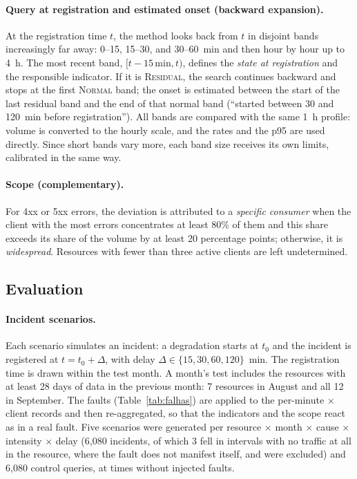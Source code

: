 \documentclass[sigconf,nonacm]{acmart}
\newcommand{\Normal}{\textsc{Normal}\xspace}
\newcommand{\Residual}{\textsc{Residual}\xspace}
\begin{document}
\paragraph{Query at registration and estimated onset (backward expansion).} At the registration time $t$, the method looks back from $t$ in disjoint bands increasingly far away: 0--15, 15--30, and 30--60~min and then hour by hour up to 4~h. The most recent band, $[t-15\,\text{min}, t)$, defines the \emph{state at registration} and the responsible indicator. If it is \Residual, the search continues backward and stops at the first \Normal band; the onset is estimated between the start of the last residual band and the end of that normal band (``started between 30 and 120~min before registration''). All bands are compared with the same 1~h profile: volume is converted to the hourly scale, and the rates and the p95 are used directly. Since short bands vary more, each band size receives its own limits, calibrated in the same way.

\paragraph{Scope (complementary).} For 4xx or 5xx errors, the deviation is attributed to a \emph{specific consumer} when the client with the most errors concentrates at least 80\% of them and this share exceeds its share of the volume by at least 20 percentage points; otherwise, it is \emph{widespread}. Resources with fewer than three active clients are left undetermined.

\subsection{Evaluation}

\paragraph{Incident scenarios.} Each scenario simulates an incident: a degradation starts at $t_0$ and the incident is registered at $t=t_0+\Delta$, with delay $\Delta\in\{15,30,60,120\}$~min. The registration time is drawn within the test month. A month's test includes the resources with at least 28 days of data in the previous month: 7 resources in August and all 12 in September. The faults (Table~\ref{tab:falhas}) are applied to the per-minute $\times$ client records and then re-aggregated, so that the indicators and the scope react as in a real fault. Five scenarios were generated per resource $\times$ month $\times$ cause $\times$ intensity $\times$ delay (6,080 incidents, of which 3 fell in intervals with no traffic at all in the resource, where the fault does not manifest itself, and were excluded) and 6,080 control queries, at times without injected faults.
\end{document}
